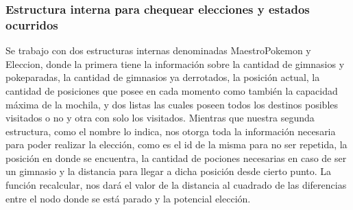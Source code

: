 \subsubsection{Estructura interna para chequear elecciones y estados ocurridos}

Se trabajo con dos estructuras internas denominadas MaestroPokemon y Eleccion, donde la primera tiene la informaci\'on sobre la cantidad de gimnasios y pokeparadas, la cantidad de gimnasios ya derrotados, la posici\'on actual, la cantidad de posiciones que posee en cada momento como tambi\'en la capacidad m\'axima de la mochila, y dos listas las cuales poseen todos los destinos posibles visitados o no y otra con solo los visitados.
Mientras que nuestra segunda estructura, como el nombre lo indica, nos otorga toda la informaci\'on necesaria para poder realizar la elecci\'on, como es el id de la misma para no ser repetida, la posici\'on en donde se encuentra, la cantidad de pociones necesarias en caso de ser un gimnasio y la distancia para llegar a dicha posici\'on desde cierto punto.
La funci\'on recalcular, nos dar\'a el valor de la distancia al cuadrado de las diferencias entre el nodo donde se está parado y la potencial elección.

